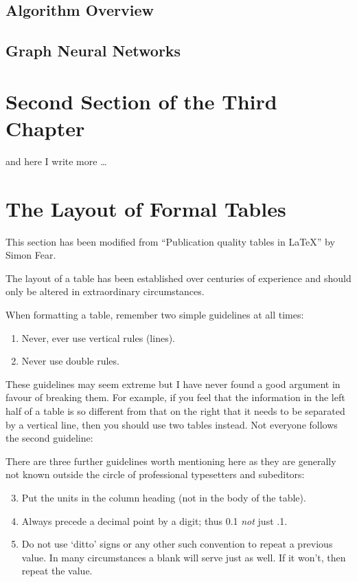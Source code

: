 \subsection{Algorithm Overview}

\subsection{Graph Neural Networks}

\subsection{}

\section{Second Section of the Third Chapter}
and here I write more \dots

\section{The Layout of Formal Tables}
This section has been modified from ``Publication quality tables in \LaTeX*''
 by Simon Fear.

The layout of a table has been established over centuries of experience and
should only be altered in extraordinary circumstances.

When formatting a table, remember two simple guidelines at all times:

\begin{enumerate}
  \item Never, ever use vertical rules (lines).
  \item Never use double rules.
\end{enumerate}

These guidelines may seem extreme but I have
never found a good argument in favour of breaking them. For
example, if you feel that the information in the left half of
a table is so different from that on the right that it needs
to be separated by a vertical line, then you should use two
tables instead. Not everyone follows the second guideline:

There are three further guidelines worth mentioning here as they
are generally not known outside the circle of professional
typesetters and subeditors:

\begin{enumerate}\setcounter{enumi}{2}
  \item Put the units in the column heading (not in the body of
          the table).
  \item Always precede a decimal point by a digit; thus 0.1
      {\em not} just .1.
  \item Do not use `ditto' signs or any other such convention to
      repeat a previous value. In many circumstances a blank
      will serve just as well. If it won't, then repeat the value.
\end{enumerate}

